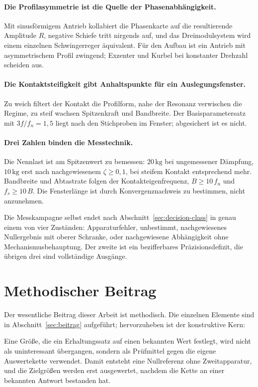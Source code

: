 \documentclass[12pt,a4paper]{report}
\begin{document}
\paragraph{Die Profilasymmetrie ist die Quelle der Phasenabhängigkeit.}
Mit sinusförmigem Antrieb kollabiert die Phasenkarte auf die
resultierende Amplitude $R$, negative Schiefe tritt nirgends auf, und
das Dreimodulsystem wird einem einzelnen Schwingerreger äquivalent. Für
den Aufbau ist ein Antrieb mit asymmetrischem Profil zwingend; Exzenter
und Kurbel bei konstanter Drehzahl scheiden aus.

\paragraph{Die Kontaktsteifigkeit gibt Anhaltspunkte für ein
Auslegungsfenster.} Zu weich filtert der Kontakt die Profilform, nahe
der Resonanz verwischen die Regime, zu steif wachsen Spitzenkraft und
Bandbreite. Der Basisparametersatz mit $3f/f_n = 1{,}5$ liegt nach den
Stichproben im Fenster; abgesichert ist es nicht.

\paragraph{Drei Zahlen binden die Messtechnik.} Die Nennlast ist am
Spitzenwert zu bemessen: $20\,\mathrm{kg}$ bei ungemessener Dämpfung,
$10\,\mathrm{kg}$ erst nach nachgewiesenem $\zeta \geq 0{,}1$, bei
steifem Kontakt entsprechend mehr. Bandbreite und Abtastrate folgen der
Kontakteigenfrequenz, $B \geq 10\,f_n$ und $f_s \geq 10\,B$. Die
Fensterlänge ist durch Konvergenznachweis zu bestimmen, nicht
anzunehmen.

Die Messkampagne selbst endet nach
Abschnitt~\ref{sec:decision-class} in genau einem von vier Zuständen:
Apparaturfehler, unbestimmt, nachgewiesenes Nullergebnis mit oberer
Schranke, oder nachgewiesene Abhängigkeit ohne Mechanismusbehauptung.
Der zweite ist ein bezifferbares Präzisionsdefizit, die übrigen drei
sind vollständige Ausgänge.

\section{Methodischer Beitrag}

Der wesentliche Beitrag dieser Arbeit ist methodisch. Die einzelnen
Elemente sind in Abschnitt~\ref{sec:beitrag} aufgeführt; hervorzuheben
ist der konstruktive Kern:

Eine Größe, die ein Erhaltungssatz auf einen bekannten Wert festlegt,
wird nicht als uninteressant übergangen, sondern als Prüfmittel gegen die
eigene Auswertekette verwendet. Damit entsteht eine Nullreferenz ohne
Zweitapparatur, und die Zielgrößen werden erst ausgewertet, nachdem die
Kette an einer bekannten Antwort bestanden hat.
\end{document}
